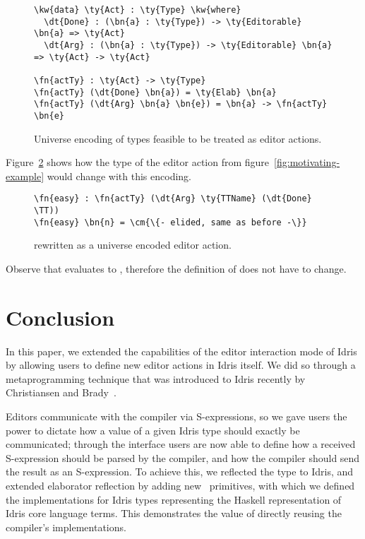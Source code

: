 \begin{figure}[b]
\begin{Verbatim}
\kw{data} \ty{Act} : \ty{Type} \kw{where}
  \dt{Done} : (\bn{a} : \ty{Type}) -> \ty{Editorable} \bn{a} => \ty{Act}
  \dt{Arg} : (\bn{a} : \ty{Type}) -> \ty{Editorable} \bn{a} => \ty{Act} -> \ty{Act}

\fn{actTy} : \ty{Act} -> \ty{Type}
\fn{actTy} (\dt{Done} \bn{a}) = \ty{Elab} \bn{a}
\fn{actTy} (\dt{Arg} \bn{a} \bn{e}) = \bn{a} -> \fn{actTy} \bn{e}
\end{Verbatim}
\caption{Universe encoding of types feasible to be treated as editor actions.}
\label{code:universe}
\end{figure}

Figure~\ref{code:universe-example} shows how the type of the  editor
action from figure~\ref{fig:motivating-example} would change with this encoding.

\begin{figure}
\begin{Verbatim}
\fn{easy} : \fn{actTy} (\dt{Arg} \ty{TTName} (\dt{Done} \TT))
\fn{easy} \bn{n} = \cm{\{- elided, same as before -\}}
\end{Verbatim}
\caption{  rewritten as a universe encoded editor action.}
\label{code:universe-example}
\end{figure}

Observe that  evaluates
to , therefore the definition of  does
not have to change.


\section{Conclusion}\label{sec:conclusion}

In this paper, we extended the capabilities of the editor interaction mode of
Idris by allowing users to define new editor actions in Idris itself. We did
so through a metaprogramming technique that was introduced to Idris recently by
Christiansen and Brady~\cite{elabref}.

Editors communicate with the compiler via S-expressions, so we gave
users the power to dictate how a value of a given Idris type should
exactly be communicated; through the  interface users
are now able to define how a received S-expression should be parsed by
the compiler, and how the compiler should send the result as an
S-expression. To achieve this, we reflected the  type to
Idris, and extended elaborator reflection by adding new \Elab\
primitives, with which we defined the  implementations
for Idris types representing the Haskell representation of Idris core
language terms. This demonstrates the value of directly reusing the
compiler's implementations.

